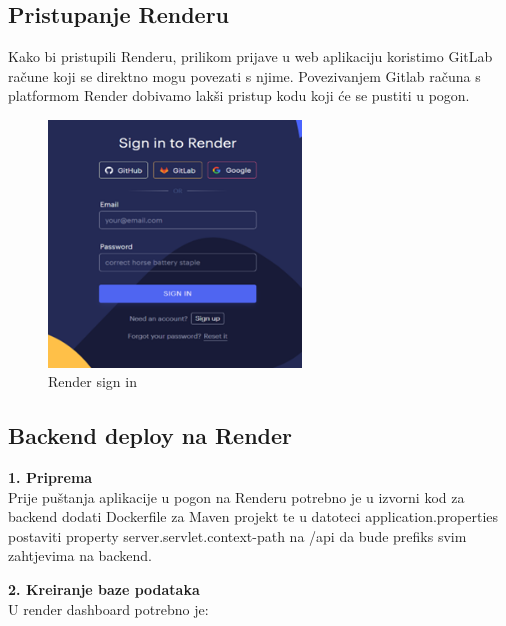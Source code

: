 			    \subsection{Pristupanje Renderu}

                Kako bi pristupili Renderu, prilikom prijave u web aplikaciju koristimo GitLab račune koji se direktno mogu povezati s njime. Povezivanjem Gitlab računa s platformom Render dobivamo lakši pristup kodu koji će se pustiti u pogon.

                \begin{figure}[H]
				\includegraphics[width=0.6\textwidth,height=0.3\textheight]{slike/renderSignIn.png}
				\centering
				\caption{Render sign in}
				\label{fig:renderSignIn}
			\end{figure}

                \subsection{Backend deploy na Render}

                \textbf{1. Priprema}\\
                
                Prije puštanja aplikacije u pogon na Renderu potrebno je u izvorni kod za backend dodati Dockerfile za Maven projekt te u datoteci application.properties postaviti property server.servlet.context-path na /api da bude prefiks svim zahtjevima na backend.
			
			\eject 

                \textbf{2. Kreiranje baze podataka}\\

                U render dashboard potrebno je:

